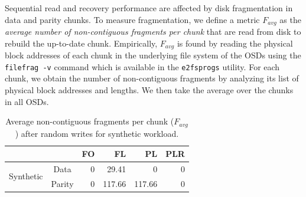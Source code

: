 Sequential read and recovery performance are affected by disk fragmentation in data and parity
chunks.  To measure fragmentation, we define a metric $F_{avg}$ as the 
\textit{average number of non-contiguous fragments per chunk} that are read
from disk to rebuild the up-to-date chunk.  Empirically, $F_{avg}$ is found by
reading the physical block addresses of each chunk in the underlying file
system of the OSDs using the \texttt{filefrag -v} command which is available
in the \texttt{e2fsprogs} utility. For each chunk, we obtain the number of
non-contiguous fragments by analyzing its list of physical block addresses and
lengths.  We then take the average over the chunks in all OSDs. 


\setlength{}
\setlength{}
\begin{table}[t] \footnotesize
  \centering
        \begin{tabular}{ccrrrr}
        \toprule
        & & FO    & FL    & PL    & PLR \\ \hline
        \multirow{2}[0]{*}{Synthetic} & Data  & 0     & 29.41 & 0     & 0 \\ \vspace{-1.1pt}
              & Parity & 0     & 117.66 & 117.66 & 0 \\ 
        \bottomrule
        \end{tabular}%
        \caption{Average non-contiguous fragments per chunk 
            ($F_{avg}$) after random writes for synthetic workload.}
  \label{table:synthetic_fragmentation}%
\end{table}%
\setlength\abovecaptionskip{10pt}
\setlength\belowcaptionskip{0pt}

